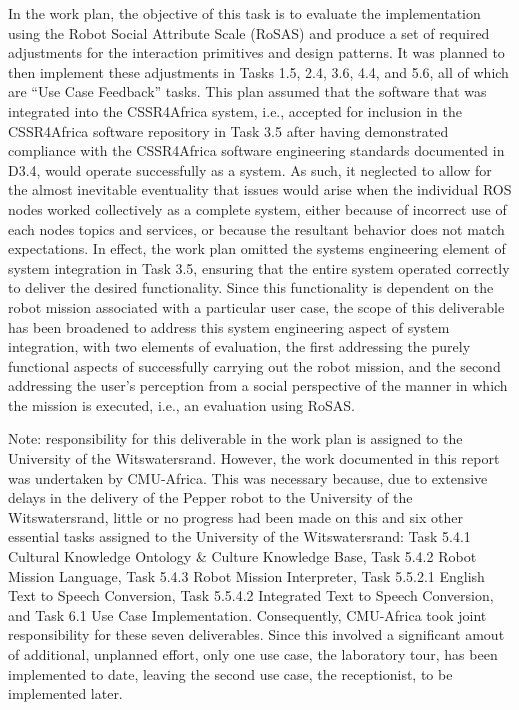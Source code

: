 \documentclass{CSSRforAfrica}
\begin{document}
In the work plan, the objective of this task is to evaluate the implementation using the Robot Social Attribute Scale (RoSAS)  \cite{Carpinellaetal2017} and produce a set of required adjustments for the interaction primitives and design patterns.  It was planned to then implement these adjustments in Tasks  1.5, 2.4, 3.6, 4.4, and 5.6, all of which are ``Use Case Feedback'' tasks. This plan assumed that the software that was integrated into the CSSR4Africa system, i.e., accepted for inclusion in the CSSR4Africa software repository in Task 3.5 after having demonstrated compliance with the CSSR4Africa software engineering standards documented in D3.4, would operate successfully as a system.   As such, it neglected to allow for the almost inevitable eventuality that issues would arise when the   individual ROS nodes worked collectively as a complete system, either because of incorrect use of each nodes topics and services, or because the resultant behavior does not match expectations.    In effect, the work plan omitted the systems engineering element of system integration in Task 3.5, ensuring that the entire system operated correctly to deliver the desired  functionality. Since this functionality is dependent on the robot mission associated with a particular user case, the scope of this deliverable has been broadened to address this system engineering aspect of system integration,  with two elements of evaluation, the first addressing the purely functional aspects of successfully carrying out the robot mission, and the second addressing the user's perception from a social perspective of the manner in which the mission is executed, i.e., an evaluation using RoSAS.

Note: responsibility for this deliverable in the  work plan is assigned to the University of the Witswatersrand. However, the work documented in this report was undertaken by CMU-Africa. This was necessary because, due to extensive delays in the delivery of the Pepper robot to the University of the Witswatersrand, little or no progress had been made on this and six other essential tasks assigned to the University of the Witswatersrand: Task 5.4.1 Cultural Knowledge Ontology \& Culture Knowledge Base, Task 5.4.2 Robot Mission Language, Task 5.4.3 Robot Mission Interpreter, Task 5.5.2.1 English Text to Speech Conversion, Task 5.5.4.2 Integrated  Text to Speech Conversion, and Task 6.1 Use Case Implementation.  Consequently,  CMU-Africa took joint responsibility for these seven deliverables.  Since this involved a significant amout of additional, unplanned effort, only one use case, the laboratory tour,  has been implemented to date, leaving the second use case, the receptionist, to be implemented later.
\end{document}
